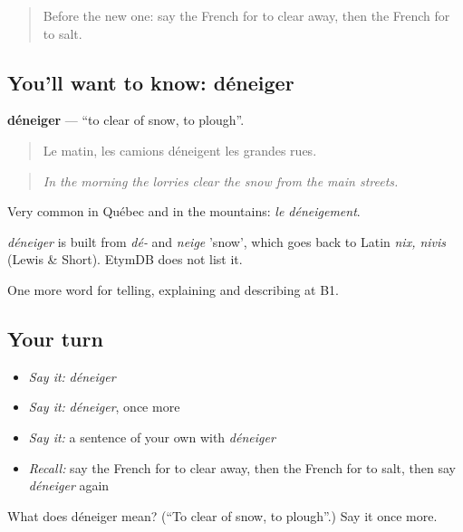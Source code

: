 \label{lesson:FR-C443-deneiger}



\begin{quote}
Before the new one: say the French for to clear away, then the French for to salt.
\end{quote}

\subsection*{You'll want to know: déneiger}
\textbf{déneiger} — \textquotedblleft{}to clear of snow, to plough\textquotedblright{}.

\begin{quote}
Le matin, les camions déneigent les grandes rues.
\end{quote}

\begin{quote}
\emph{In the morning the lorries clear the snow from the main streets.}
\end{quote}

Very common in Québec and in the mountains: \emph{le déneigement}.

\begin{cousinweb}
\emph{déneiger} is built from \emph{dé-} and \emph{neige} 'snow', which goes back to Latin \emph{nix, nivis} (Lewis \& Short). EtymDB does not list it.
\end{cousinweb}

\begin{grammarlens}[title={What you've built}]
One more word for telling, explaining and describing at B1.
\end{grammarlens}

\subsection*{Your turn}
\begin{itemize}
\raggedright
  \item \emph{Say it:} \emph{déneiger}
  \item \emph{Say it:} \emph{déneiger}, once more
  \item \emph{Say it:} a sentence of your own with \emph{déneiger}
  \item \emph{Recall:} say the French for to clear away, then the French for to salt, then say \emph{déneiger} again
\end{itemize}

\begin{tcolorbox}[breakable,colback=teal!4,colframe=teal!35!black,title={Before you move on}]
What does déneiger mean? (\textquotedblleft{}To clear of snow, to plough\textquotedblright{}.) Say it once more.
\end{tcolorbox}
